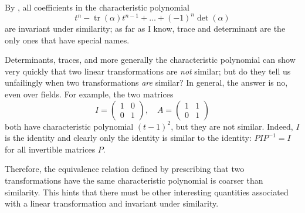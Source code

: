 By , all coefficients in the characteristic
polynomial
\[
  t^n - \operatorname{tr}(\alpha)t^{n-1} + \dots + (-1)^n \det(\alpha)
\]
are invariant under similarity; as far as I know, trace and
determinant are the only ones that have special names.

Determinants, traces, and more generally the characteristic polynomial
can show very quickly that two linear transformations are \emph{not}
similar; but do they tell us unfailingly when two transformations
\emph{are} similar? In general, the answer is no, even over
fields. For example, the two matrices
\[
  I = \begin{pmatrix} 1 & 0 \\ 0 & 1 \end{pmatrix}, \quad A
  = \begin{pmatrix} 1 & 1 \\ 0 & 1 \end{pmatrix}
\]
both have characteristic polynomial $(t-1)^2$, but they are not
similar. Indeed, $I$ is the identity and clearly only the identity is
similar to the identity: $PIP^{-1} = I$ for all invertible matrices
$P$.

Therefore, the equivalence relation defined by prescribing that two
transformations have the same characteristic polynomial is coarser
than similarity. This hints that there must be other interesting
quantities associated with a linear transformation and invariant under
similarity.

